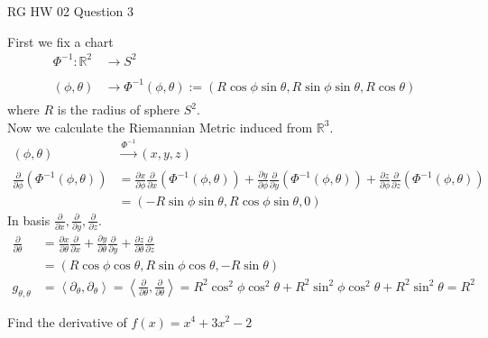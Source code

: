 \documentclass{article}
\begin{document}
\maketitle
RG HW 02 Question 3
\pagebreak

\begin{homeworkProblem}
    First we fix a chart 
    \begin{align}
        \Phi^{-1} : \mathbb{R}^2 &\xrightarrow[]{} S^2 \\
        (\phi, \theta) &\xrightarrow[]{} \Phi^{-1}(\phi, \theta) := (R \cos \phi \sin \theta, R \sin \phi \sin \theta, R \cos \theta)
    \end{align}
    where $R$ is the radius of sphere $S^2$.\\
    Now we calculate the Riemannian Metric induced from $\mathbb{R}^3$.
    \begin{align}
        (\phi, \theta) &\xrightarrow[]{\Phi^{-1}} (x,y,z)\\
        \frac{ \partial }{ \partial \phi } \left( \Phi^{-1} \left( \phi, \theta \right)\right) 
        &= \frac{ \partial x }{ \partial \phi } \frac{ \partial  }{ \partial x } \left( \Phi^{-1} \left( \phi, \theta \right)\right) 
        + \frac{ \partial y }{ \partial \phi } \frac{ \partial  }{ \partial y } \left( \Phi^{-1} \left( \phi, \theta \right)\right) 
        + \frac{ \partial z }{ \partial \phi } \frac{ \partial }{ \partial z } \left( \Phi^{-1} \left( \phi, \theta \right)\right) \\
        &= (-R \sin \phi \sin \theta, R \cos \phi \sin \theta, 0)
    \end{align}
    In basis $\frac{ \partial }{ \partial x }, \frac{ \partial }{ \partial y }, \frac{ \partial }{ \partial z }$.\\
    \begin{align}
        \frac{ \partial }{ \partial \theta } &= \frac{ \partial x }{ \partial \theta } \frac{ \partial }{ \partial x } 
        + \frac{ \partial y }{ \partial \theta } \frac{ \partial }{ \partial y }
        + \frac{ \partial z }{ \partial \theta } \frac{ \partial  }{ \partial z }\\
        &= (R \cos \phi \cos \theta, R \sin \phi \cos \theta, -R \sin \theta)\\
        g_{\theta, \theta} &= \left\langle \partial_{\theta}, \partial_{\theta} \right\rangle 
        = \left\langle \frac{ \partial  }{ \partial \theta }, \frac{ \partial  }{ \partial \theta }\right\rangle
        = R^2 \cos^2 \phi \cos^2 \theta + R^2 \sin^2 \phi \cos^2 \theta + R^2 \sin^2 \theta = R^2
    \end{align}

             
    


\end{homeworkProblem}

\pagebreak



\begin{homeworkProblem}
    Find the derivative of \(f(x) = x^4 + 3x^2 - 2\)
\end{homeworkProblem}
\end{document}
